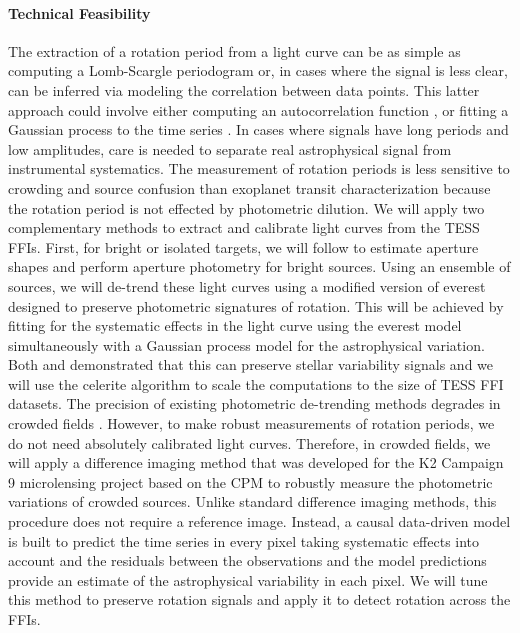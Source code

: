 \documentclass[letterpaper,12pt,preprint]{hack_aastex}
\newcommand{\eg}{{\it e.g.}}
\begin{document}
\paragraph{Technical Feasibility}
The extraction of a rotation period from a light curve can be as simple as
computing a Lomb-Scargle periodogram or, in cases where the signal is less
clear, can be inferred via modeling the correlation between data points.
This latter approach could involve either computing an autocorrelation
function \citep[\eg][]{mcquillan2013}, or fitting a Gaussian process to the
time series \citep{angus2017, foreman-mackey2017}.
In cases where signals have long periods and low amplitudes, care is needed to
separate real astrophysical signal from instrumental systematics.
The measurement of rotation periods is less sensitive to crowding and source
confusion than exoplanet transit characterization because the rotation period
is not effected by photometric dilution.
We will apply two complementary methods to extract and calibrate light curves
from the TESS FFIs.
First, for bright or isolated targets, we will follow \citet{montet2017} to
estimate aperture shapes and perform aperture photometry for bright sources.
Using an ensemble of sources, we will de-trend these light curves using a
modified version of \textsf{everest} \citep{luger2016, luger2017} designed to
preserve photometric signatures of rotation.
This will be achieved by fitting for the systematic effects in the light curve
using the \textsf{everest} model simultaneously with a Gaussian process model
for the astrophysical variation.
Both \citet{aigrain2016} and \citet{luger2016} demonstrated that this can
preserve stellar variability signals and we will use the \textsf{celerite}
algorithm \citep{foreman-mackey2017} to scale the computations to the size of
TESS FFI datasets.
The precision of existing photometric de-trending methods degrades in crowded
fields \citep[for example,][]{luger2017}.
However, to make robust measurements of rotation periods, we do not need
absolutely calibrated light curves.
Therefore, in crowded fields, we will apply a difference imaging method that
was developed for the K2 Campaign 9 microlensing project \citep{henderson2016}
based on the \textsf{CPM} \citep{wang2016} to robustly measure the photometric
variations of crowded sources.
Unlike standard difference imaging methods, this procedure does not require a
reference image.
Instead, a causal data-driven model is built to predict the time series in
every pixel taking systematic effects into account and the residuals between
the observations and the model predictions provide an estimate of the
astrophysical variability in each pixel.
We will tune this method to preserve rotation signals and apply it to detect
rotation across the FFIs.
\end{document}
